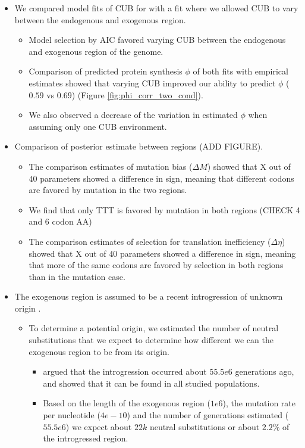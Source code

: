\documentclass[12pt]{article}
\begin{document}
\begin{itemize}
	\item We compared model fits of CUB for \kluyveri with a fit where we allowed CUB to vary between the endogenous and exogenous region.
	\begin{itemize}
		\item Model selection by AIC favored varying CUB between the endogenous and exogenous region of the \kluyveri genome.
		\item Comparison of predicted protein synthesis $\phi$ of both fits with empirical estimates showed that varying CUB improved our ability to predict $\phi$ ($0.59$ vs $0.69$) (Figure \ref{fig:phi_corr_two_cond}).
		\item We also observed a decrease of the variation in estimated $\phi$ when assuming only one CUB environment.
	\end{itemize}
	\item Comparison of posterior estimate between regions (ADD FIGURE).
	\begin{itemize}
		\item The comparison estimates of mutation bias ($\Delta M$) showed that X out of $40$ parameters showed a difference in sign, meaning that different codons are favored by mutation in the two regions.
		\item We find that only TTT is favored by mutation in both regions (CHECK 4 and 6 codon AA) 
		\item The comparison estimates of selection for translation inefficiency ($\Delta \eta$) showed that X out of $40$ parameters showed a difference in sign, meaning that more of the same codons are favored by selection in both regions than in the mutation case.
	\end{itemize}
	\item The exogenous region is assumed to be a recent introgression of unknown origin \citep{friedrich2015}.
	\begin{itemize}
		\item To determine a potential origin, we estimated the number of neutral substitutions that we expect to determine how different we can the exogenous region to be from its origin.
		\begin{itemize}
			\item \citep{friedrich2015} argued that the introgression occurred about $55.5e6$ generations ago, and showed that it can be found in all studied populations.
			\item Based on the length of the exogenous region ($1e6$), the mutation rate per nucleotide ($4e-10$) and the number of generations estimated ($55.5e6$) we expect about $22k$ neutral substitutions or about $2.2 \%$ of the introgressed region.

\end{itemize}
\end{itemize}
\end{itemize}
\end{document}
